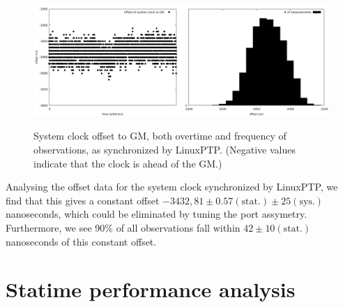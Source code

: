\documentclass{article}
\begin{document}
\begin{figure}[h]
\includegraphics[width=0.5\textwidth]{gm_ref_offset_overtime.pdf}\includegraphics[width=0.5\textwidth]{gm_ref_offset.pdf}
\caption{System clock offset to GM, both overtime and frequency of observations, as synchronized by LinuxPTP. (Negative values indicate that the clock is ahead of the GM.)}
\label{fig:ref_sys_offset}
\end{figure}

Analysing the offset data for the system clock synchronized by LinuxPTP, we find that this gives a constant offset $-3432,81\pm 0.57 (\text{stat.}) \pm 25(\text{sys.})$ nanoseconds, which could be eliminated by tuning the port assymetry. Furthermore, we see 90\% of all observations fall within $42 \pm 10 (\text{stat.})$ nanoseconds of this constant offset.

\section{Statime performance analysis}
\end{document}

